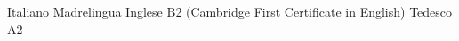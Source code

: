 

\begin{cvhonors}

  \cvskill
    {Italiano}
    {Madrelingua}
  \cvskill
    {Inglese}
    {B2 (Cambridge First Certificate in English)}
\cvskill
    {Tedesco}
    {A2}

\end{cvhonors}
